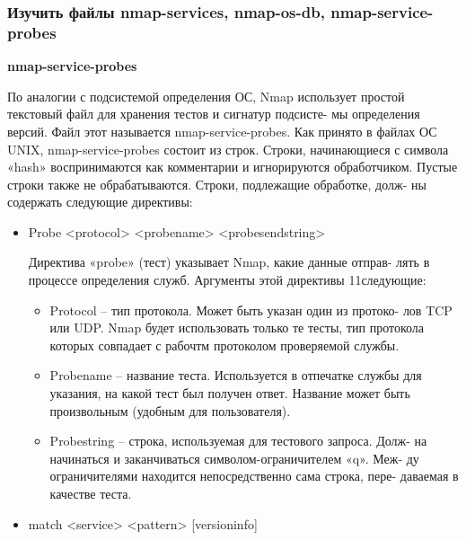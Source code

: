 \documentclass[12pt,a4paper]{article}
\begin{document}
\subsubsection{Изучить файлы nmap-services, nmap-os-db, nmap-service-probes}

\textbf{nmap-service-probes}

По аналогии с подсистемой определения ОС, Nmap использует
простой текстовый файл для хранения тестов и сигнатур подсисте-
мы определения версий. Файл этот называется nmap-service-probes.
Как принято в файлах ОС UNIX, nmap-service-probes состоит из
строк. Строки, начинающиеся с символа «hash» воспринимаются
как комментарии и игнорируются обработчиком. Пустые строки
также не обрабатываются. Строки, подлежащие обработке, долж-
ны содержать следующие директивы:
\begin{itemize}
\item Probe <protocol> <probename> <probesendstring>

Директива «probe» (тест) указывает Nmap, какие данные отправ-
лять в процессе определения служб. Аргументы этой директивы
11следующие:
\begin{itemize}
\item Protocol – тип протокола. Может быть указан один из протоко-
лов TCP или UDP. Nmap будет использовать только те тесты, тип
протокола которых совпадает с рабочтм протоколом проверяемой
службы.
\item Probename – название теста. Используется в отпечатке службы для
указания, на какой тест был получен ответ. Название может быть
произвольным (удобным для пользователя).
\item Probestring – строка, используемая для тестового запроса. Долж-
на начинаться и заканчиваться символом-ограничителем «q». Меж-
ду ограничителями находится непосредственно сама строка, пере-
даваемая в качестве теста.
\end{itemize}
\item match <service> <pattern> [versioninfo]


\end{itemize}
\end{document}
